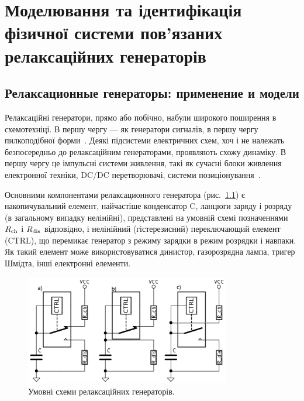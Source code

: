 \chapter{Моделювання та ідентифікація фізичної системи пов'язаних релаксаційних генераторів}

\newcommand{\RelaxBjtIi}{системи з трьох пов'язаних релаксаційних генераторів на парі компліментарних транзисторів}
\newcommand{\RelaxShIi}{системи з трьох пов'язаних релаксаційних генераторів на основі тригерів Шмідта}

\section{Релаксационные генераторы: применение и модели}

Релаксаційні генератори, прямо або побічно, набули широкого
поширення в схемотехніці. В першу чергу --- як генератори
сигналів, в першу чергу пилкоподібної форми~\cite{horowitz,
mishenko_du_small_relax}. Деякі підсистеми електричних схем, хоч і
не належать безпосередньо до релаксаційним генераторами,
проявляють схожу динаміку. В першу чергу це імпульсні системи
живлення, такі як сучасні блоки живлення електронної техніки,
DC/DC перетворювачі, системи позиціонування~\cite{atu_st104b}.

Основними компонентами релаксационного генератора
(рис.~\ref{atu:f:relax_types}) є накопичувальний елемент, найчастіше
конденсатор C, ланцюги заряду і розряду (в загальному випадку
нелінійні), представлені на умовній схемі позначеннями
$ R _\mathrm{ch} $ і
$ R _\mathrm{dis} $ відповідно, і нелінійний (гістерезисний) переключающий
елемент (CTRL), що перемикає генератор з режиму зарядки в режим
розрядки і навпаки. Як такий елемент може використовуватися
динистор, газорозрядна лампа, тригер Шмідта, інші електронні елементи.

\begin{figure}[htb!]
  \centerline{\includegraphics[width=0.8\textwidth]{p/relax_types.png} }
\caption{Умовні схеми релаксаційних генераторів.}
\label{atu:f:relax_types}
\end{figure}

